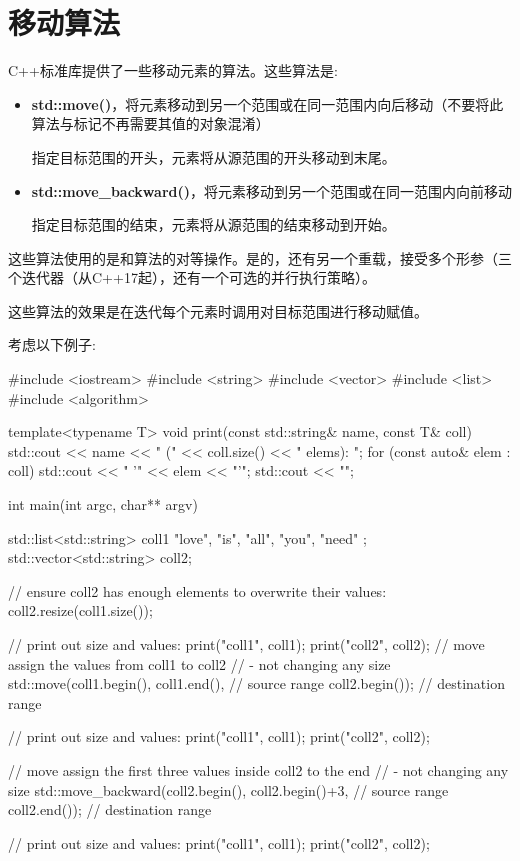 \section{移动算法}
C++标准库提供了一些移动元素的算法。这些算法是:

\begin{itemize}
	\item \textbf{std::move()}，将元素移动到另一个范围或在同一范围内向后移动（不要将此算法与标记不再需要其值的对象混淆）

	指定目标范围的开头，元素将从源范围的开头移动到末尾。
	\item \textbf{std::move_backward()}，将元素移动到另一个范围或在同一范围内向前移动

	指定目标范围的结束，元素将从源范围的结束移动到开始。
\end{itemize}

这些算法使用的是和算法的对等操作。是的，还有另一个重载，接受多个形参（三个迭代器（从C++17起），还有一个可选的并行执行策略）。

这些算法的效果是在迭代每个元素时调用对目标范围进行移动赋值。

考虑以下例子:

\begin{cppcode}
#include <iostream>
#include <string>
#include <vector>
#include <list>
#include <algorithm>

template<typename T>
void print(const std::string& name, const T& coll)
{
	std::cout << name << " (" << coll.size() << " elems): ";
	for (const auto& elem : coll) {
		std::cout << " '" << elem << "'";
	}
	std::cout << "\n";
}

int main(int argc, char** argv)
{
	std::list<std::string> coll1 { "love", "is", "all", "you", "need" };
	std::vector<std::string> coll2;

	// ensure coll2 has enough elements to overwrite their values:
	coll2.resize(coll1.size());

	// print out size and values:
	print("coll1", coll1);
	print("coll2", coll2);
	// move assign the values from coll1 to coll2
	// - not changing any size
	std::move(coll1.begin(), coll1.end(), // source range
	coll2.begin()); // destination range

	// print out size and values:
	print("coll1", coll1);
	print("coll2", coll2);

	// move assign the first three values inside coll2 to the end
	// - not changing any size
	std::move_backward(coll2.begin(), coll2.begin()+3, // source range
	coll2.end()); // destination range

	// print out size and values:
	print("coll1", coll1);
	print("coll2", coll2);
}
\end{cppcode}

